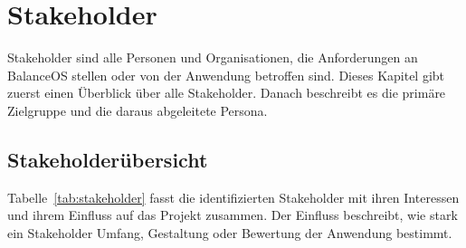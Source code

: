 \section{Stakeholder}\label{sec:stakeholder}
Stakeholder sind alle Personen und Organisationen, die Anforderungen an BalanceOS stellen oder von der Anwendung betroffen sind. Dieses Kapitel gibt zuerst einen Überblick über alle Stakeholder. Danach beschreibt es die primäre Zielgruppe und die daraus abgeleitete Persona.

\subsection{Stakeholderübersicht}
Tabelle~\ref{tab:stakeholder} fasst die identifizierten Stakeholder mit ihren Interessen und ihrem Einfluss auf das Projekt zusammen. Der Einfluss beschreibt, wie stark ein Stakeholder Umfang, Gestaltung oder Bewertung der Anwendung bestimmt.

